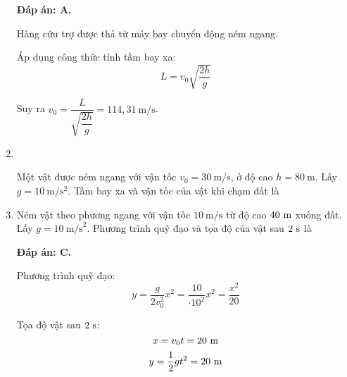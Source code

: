 \begin{enumerate}[label=\bfseries Câu \arabic*:]
	\hideall
	{	\textbf{Đáp án: A.}
		
		Hàng cứu trợ được thả từ máy bay chuyển động ném ngang.
		
		Áp dụng công thức tính tầm bay xa:
		\[L=v_0\sqrt{\dfrac{2h}{g}}\]
		
		Suy ra $v_0 = \dfrac{L}{\sqrt{\dfrac{2h}{g}}}=114,31\ \text{m/s}$.
	}

\item {}\\
{Một vật được ném ngang với vận tốc $v_0 = \SI{30}{\meter/\second}$, ở độ cao $h = \SI{80}{\meter}$. Lấy $g=\SI{10}{\meter/\second^2}$. Tầm bay xa và vận tốc của vật khi chạm đất là
}
	
	\item {}
	
	
	{Ném vật theo phương ngang với vận tốc $10\ \text{m/s}$ từ độ cao $40\ \text m$ xuống đất. Lấy $g=10\ \text{m/s}^2$. Phương trình quỹ đạo và tọa độ của vật sau $2\ \text s$ là
	}
	
	\hideall
	{	\textbf{Đáp án: C.}
		
		Phương trình quỹ đạo:
		\[y=\dfrac{g}{2v_0^2}x^2 = \dfrac{10}{\cdot 10^2}x^2 = \dfrac{x^2}{20}\]
		
		Tọa độ vật sau $2\ \text s$:
		\[x=v_0 t = 20\ \text m\]
		\[y=\dfrac{1}{2}gt^2 = 20\ \text m\]
	}
\end{enumerate}
